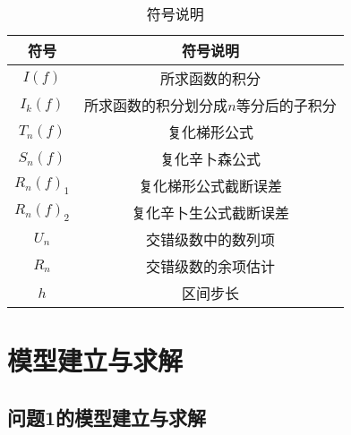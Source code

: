 \documentclass[UTF8]{ctexart}
\begin{document}
	\begin{table}[!htbp]  %
		\centering
		\caption{符号说明}%
		\label{tab:FuHuHaoShuoMing} %
	\begin{tabular}{cc}%
		\hline  %
		符号&符号说明\\
		\hline  
		$I(f)$	&所求函数的积分\\
		
		$I_k(f)$	&所求函数的积分划分成$n$等分后的子积分
\\
		
		$T_n(f)$	&复化梯形公式\\
		
		$S_n(f)$	&复化辛卜森公式\\
		
		$R_n(f)_1$	&复化梯形公式截断误差\\
		
		$R_n(f)_2$	&复化辛卜生公式截断误差\\
		
		${U_n}$	&交错级数中的数列项\\
		
		$R_n$	&交错级数的余项估计\\
		
		$h$	&区间步长\\
		\hline
	\end{tabular}	
	\end{table}	
	
	\section{模型建立与求解} %
		\subsection{问题1的模型建立与求解} %
\end{document}
